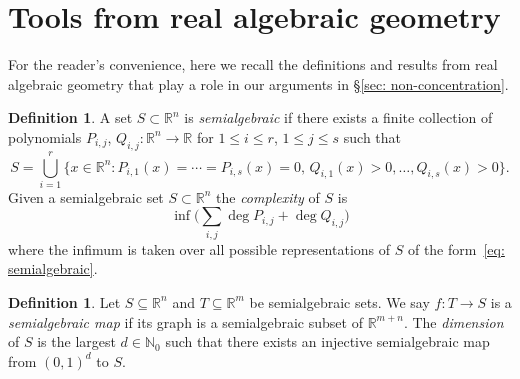\documentclass[reqno]{amsart}
\numberwithin{equation}{section}
\newcommand{\N}{\mathbb{N}}
\newcommand{\R}{\mathbb{R}}
\theoremstyle{plain}
\theoremstyle{definition}
\newtheorem{definition}[theorem]{Definition}
\begin{document}



\appendix




\section{Tools from real algebraic geometry}

For the reader's convenience, here we recall the definitions and results from real algebraic geometry that play a role in our arguments in \S\ref{sec: non-concentration}. 


\begin{definition} A set $S \subset \R^n$ is \emph{semialgebraic} if there exists a finite collection of polynomials $P_{i,j}$, $Q_{i,j} \colon \R^n \to \R$ for $1 \leq i \leq r$, $1 \leq j \leq s$ such that
\begin{equation}\label{eq: semialgebraic}
    S = \bigcup_{i=1}^r \big\{x \in \R^n : P_{i,1}(x) = \cdots = P_{i,s}(x) = 0,\, Q_{i,1}(x) > 0, \dots, Q_{i,s}(x) > 0\big\}.
\end{equation}
Given a semialgebraic set $S \subset \R^n$ the \textit{complexity} of $S$ is 
\begin{equation*}
    \inf\Big( \sum_{i,j} \deg P_{i,j} + \deg Q_{i,j} \Big)
\end{equation*}
where the infimum is taken over all possible representations of $S$ of the form~\eqref{eq: semialgebraic}.
\end{definition}

\begin{definition} Let $S \subseteq \R^n$ and $T\subseteq \R^m$ be semialgebraic sets. We say $f \colon T\rightarrow S$ is a \textit{semialgebraic map} if its graph is a semialgebraic subset of $\mathbb{R}^{m+n}$. The \textit{dimension} of $S$ is the largest $d \in \N_0$ such that there exists an injective semialgebraic map from $(0, 1)^d$ to $S$.
\end{definition}
\end{document}

